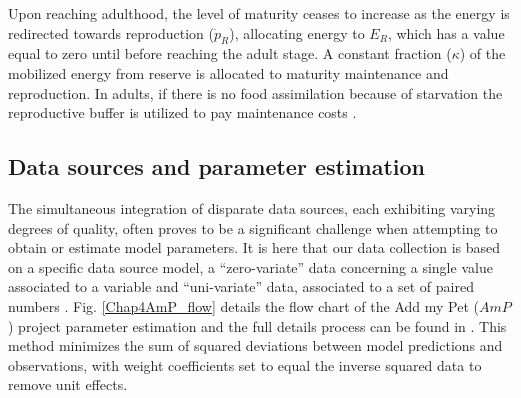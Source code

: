 Upon reaching adulthood, the level of maturity ceases to increase as the energy is redirected towards reproduction ($\dot{p}_{R}$), allocating energy to $E_{R}$, which has a value equal to zero until before reaching the adult stage. A constant fraction ($\kappa$) of the mobilized energy from reserve is allocated to maturity maintenance and reproduction. In adults, if there is no food assimilation because of starvation the reproductive buffer is utilized to pay maintenance costs \citep{BrosLlor2016,GattPeti2017,MenuPecq2023}.\\

\subsection{Data sources and parameter estimation}

The simultaneous integration of disparate data sources, each exhibiting varying degrees of quality, often proves to be a significant challenge when attempting to obtain or estimate model parameters. It is here that our data collection is based on a specific data source model, a ``zero-variate'' data concerning a single value associated to a variable and ``uni-variate'' data, associated to a set of paired numbers \citep{MarqLika2019}. Fig. \ref{Chap4AmP_flow} details the flow chart of the Add my Pet ($AmP$) project parameter estimation and the full details process can be found in \cite{MarqAugu2018}. This method minimizes the sum of squared deviations between model predictions and observations, with weight coefficients set to equal the inverse squared data to remove unit effects.\\

